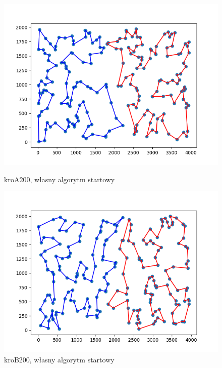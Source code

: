 \documentclass[11pt]{article}
\begin{document}
\begin{figure}[H]
    \vspace{0.5cm}

    \begin{minipage}[t]{0.45\textwidth}
        \centering
        \includegraphics[width=\linewidth]{best_paths/kroA200/traverse_steepest/split_paths_regret_TSP}
        \caption{kroA200, własny algorytm startowy}
    \end{minipage}
    \hfill
    \begin{minipage}[t]{0.45\textwidth}
        \centering
        \includegraphics[width=\linewidth]{best_paths/kroB200/traverse_steepest/split_paths_regret_TSP}
        \caption{kroB200, własny algorytm startowy}
    \end{minipage}
    \label{fig:minipage-steepest-edge}
\end{figure}
\end{document}
